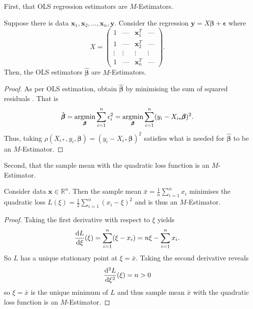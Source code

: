 First, that OLS regression estimators are $M$-Estimators.

\begin{proposition}
    \label{prop:ols}
    Suppose there is data $\pmb{x}_1, \pmb{x}_2, \ldots, \pmb{x}_n, \pmb{y}$. Consider the regression $\pmb{y} = X\pmb{\beta} + \pmb{\epsilon}$ where
    \begin{equation}
        X = \begin{pmatrix}
        1 & \text{---} & \pmb{x}_1^T & \text{---} \\
        1 & \text{---} & \pmb{x}_2^T & \text{---} \\
        \vdots & \vdots & \vdots & \vdots \\
        1 & \text{---} & \pmb{x}_n^T & \text{---}
        \end{pmatrix}.
    \end{equation}
    Then, the OLS estimators $\hat{\pmb{\beta}}$ are $M$-Estimators.
\end{proposition}

\begin{proof}
    As per OLS estimation, obtain $\hat{\pmb{\beta}}$ by minimising the sum of squared residuals \citep[p.~15]{hayashi_2000}. That is
    \begin{equation}
        \hat{\pmb{\beta}} = \argmin_{\pmb{\beta}} \sum_{i=1}^n \epsilon_i^2 = \argmin_{\pmb{\beta}} \sum_{i=1}^n (y_i - X_{i*} \pmb{\beta})^2.
    \end{equation}
    Thus, taking $\rho(X_{i*}, y_i, \pmb{\beta}) = (y_i - X_{i*} \pmb{\beta})^2$ satisfies what is needed for $\hat{\pmb{\beta}}$ to be an $M$-Estimator.
\end{proof}

Second, that the sample mean with the quadratic loss function is an $M$-Estimator.

\begin{proposition}
    \label{prop:squared-loss}
    Consider data $\pmb{x} \in \mathbb{R}^n$. Then the sample mean $\bar{x} = \frac{1}{n} \sum_{i=1}^n x_i$ minimises the quadratic loss $L(\xi) = \frac{1}{2} \sum_{i=1}^n (x_i - \xi)^2$ and is thus an $M$-Estimator.
\end{proposition}

\begin{proof}
    Taking the first derivative with respect to $\xi$ yields
    \begin{equation}
        \frac{\mathop{}\!\mathrm{d}{L}}{\mathop{}\!\mathrm{d}{\xi}}(\xi) = \sum_{i=1}^n(\xi - x_i) = n\xi - \sum_{i=1}^n x_i.
    \end{equation}
    So $L$ has a unique stationary point at $\xi = \bar{x}$. Taking the second derivative reveals
    \begin{equation}
        \frac{\mathop{}\!\mathrm{d}^2{L}}{\mathop{}\!\mathrm{d}{\xi^2}}(\xi) = n > 0
    \end{equation}
    so $\xi = \bar{x}$ is the unique minimum of $L$ and thus sample mean $\bar{x}$ with the quadratic loss function is an $M$-Estimator.
\end{proof}

